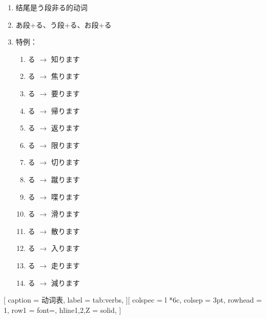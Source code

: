\begin{enumerate}
    \item 结尾是う段非る的动词
    \item あ段+る、う段+る、お段+る
    \item 特例：
    \begin{enumerate}
        \item {}る $\rightarrow$ 知ります
        \item {}る $\rightarrow$ 焦ります
        \item {}る $\rightarrow$ 要ります
        \item {}る $\rightarrow$ 帰ります
        \item {}る $\rightarrow$ 返ります
        \item {}る $\rightarrow$ 限ります
        \item {}る $\rightarrow$ 切ります
        \item {}る $\rightarrow$ 蹴ります
        \item {}る $\rightarrow$ 喋ります
        \item {}る $\rightarrow$ 滑ります
        \item {}る $\rightarrow$ 散ります
        \item {}る $\rightarrow$ 入ります
        \item {}る $\rightarrow$ 走ります
        \item {}る $\rightarrow$ 減ります
    \end{enumerate}
\end{enumerate}


[
    caption = {动词表},
    label = {tab:verbs},
][
  colspec = {l *{6}{c}},
  colsep = 3pt,
  rowhead = 1,
  row{1} = {font=\bfseries},
  hline{1,2,Z} = {solid},
]
